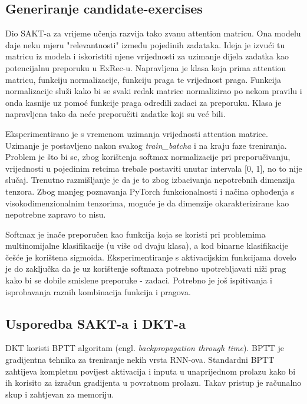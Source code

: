 		\subsection{Generiranje candidate-exercises}
		Dio SAKT-a za vrijeme učenja razvija tako zvanu attention matricu. Ona modelu daje neku mjeru "relevantnosti" između pojedinih zadataka. Ideja je izvući tu matricu iz modela i iskoristiti njene vrijednosti za uzimanje dijela zadatka kao potencijalnu preporuku u ExRec-u. Napravljena je klasa koja prima attention matricu, funkciju normalizacije, funkciju praga te vrijednost praga. Funkcija normalizacije služi kako bi se svaki redak matrice normalizirao po nekom pravilu i onda kasnije uz pomoć funkcije praga odredili zadaci za preporuku. Klasa je napravljena tako da neće preporučiti zadatke koji su već bili. 

		Eksperimentirano je s vremenom uzimanja vrijednosti attention matrice. Uzimanje je postavljeno nakon svakog \textit{train\_batcha} i na kraju faze treniranja. Problem je što bi se, zbog korištenja softmax normalizacije pri preporučivanju, vrijednosti u pojedinim retcima trebale postaviti unutar intervala [0, 1], no to nije slučaj. Trenutno razmišljanje je da je to zbog izbacivanja nepotrebnih dimenzija tenzora. Zbog manjeg poznavanja PyTorch funkcionalnosti i načina ophođenja s visokodimenzionalnim tenzorima, moguće je da dimenzije okarakterizirane kao nepotrebne zapravo to nisu.

		Softmax je inače preporučen kao funkcija koja se koristi pri problemima multinomijalne klasifikacije (u više od dvaju klasa), a kod binarne klasifikacije češće je korištena sigmoida. Eksperimentiranje s aktivacijskim funkcijama dovelo je do zaključka da je uz korištenje softmaxa potrebno upotrebljavati niži prag kako bi se dobile smislene preporuke - zadaci. Potrebno je još ispitivanja i isprobavanja raznih kombinacija funkcija i pragova.

		\subsection{Usporedba SAKT-a i DKT-a}

		DKT koristi BPTT algoritam (engl. \textit{backpropagation through time}). BPTT je gradijentna tehnika za treniranje nekih vrsta RNN-ova. Standardni BPTT zahtijeva kompletnu povijest aktivacija i inputa u unaprijednom prolazu kako bi ih korisito za izračun gradijenta u povratnom prolazu. Takav pristup je računalno skup i zahtjevan za memoriju.

